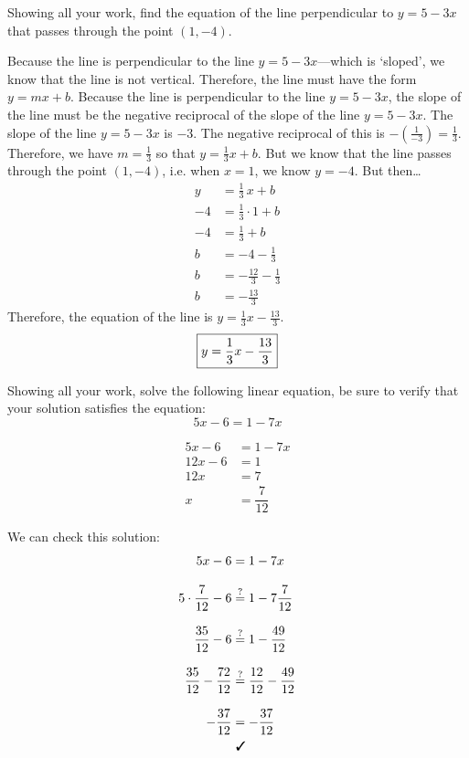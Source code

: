\documentclass[11pt,letterpaper]{article}
\begin{document}
 Showing all your work, find the equation of the line perpendicular to $y= 5 - 3x$ that passes through the point $(1, -4)$. \pspace

\sol Because the line is perpendicular to the line $y= 5 - 3x$---which is `sloped', we know that the line is not vertical. Therefore, the line must have the form $y= mx + b$. Because the line is perpendicular to the line $y= 5 - 3x$, the slope of the line must be the negative reciprocal of the slope of the line $y= 5 - 3x$. The slope of the line $y= 5 - 3x$ is $-3$. The negative reciprocal of this is $-(\frac{1}{-3})= \frac{1}{3}$. Therefore, we have $m= \frac{1}{3}$ so that $y= \frac{1}{3}x + b$. But we know that the line passes through the point $(1, -4)$, i.e. when $x= 1$, we know $y= -4$. But then\dots
	\[
	\begin{aligned}
	y&= \frac{1}{3}\,x + b \\
	-4&= \frac{1}{3} \cdot 1 + b \\
	-4&= \frac{1}{3} + b \\
	b&= -4 - \frac{1}{3} \\
	b&= -\frac{12}{3} - \frac{1}{3} \\
	b&= -\frac{13}{3}
	\end{aligned}
	\]
Therefore, the equation of the line is $y= \frac{1}{3}x - \frac{13}{3}$. \pspace
	\[
	\boxed{%
	y= \frac{1}{3}x - \frac{13}{3}
	}
	\]



\newpage



 Showing all your work, solve the following linear equation, be sure to verify that your solution satisfies the equation: 
	\[
	5x - 6= 1 - 7x
	\] \pspace

\sol 
	\[
	\begin{aligned}
	5x - 6&= 1 - 7x \\[0.3cm]
	12x - 6&= 1 \\[0.3cm]
	12x&= 7 \\[0.3cm]
	x&= \dfrac{7}{12}
	\end{aligned}
	\] \pspace

We can check this solution: \pspace
	\[
	\begin{aligned}
	5x - 6&= 1 - 7x \\[0.3cm]
	5 \cdot \dfrac{7}{12} - 6&\stackrel{?}{=} 1 - 7 \dfrac{7}{12} \\[0.3cm]
	\dfrac{35}{12} - 6&\stackrel{?}{=} 1 - \dfrac{49}{12} \\[0.3cm]
	\dfrac{35}{12} - \dfrac{72}{12}&\stackrel{?}{=} \frac{12}{12} - \dfrac{49}{12} \\[0.3cm]
	-\frac{37}{12}&= -\frac{37}{12} \\
	&\,\,\text{\cmark}
	\end{aligned}
	\] \pspace
\end{document}
